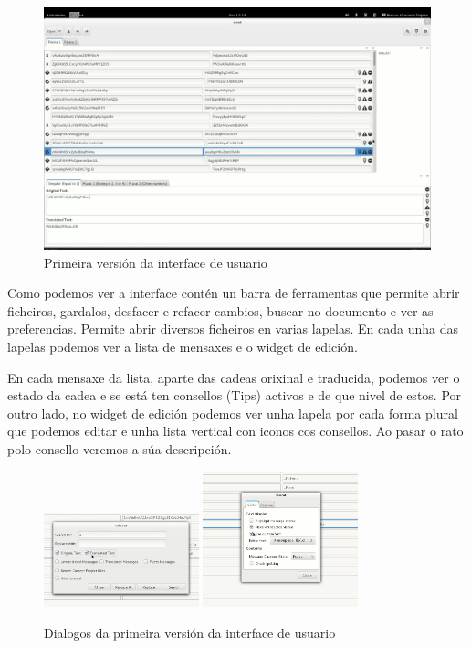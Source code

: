 \begin{figure}[h!]
  \centering
    \includegraphics[width=\textwidth]{img/gsoc1_it2_ui.png}
    \caption{Primeira versión da interface de usuario}
    \label{fig:ui:v1:general}
\end{figure}

Como podemos ver a interface contén un barra de ferramentas que permite abrir ficheiros, gardalos, desfacer e refacer cambios, buscar no documento e ver as preferencias. Permite abrir diversos ficheiros en varias lapelas. En cada unha das lapelas podemos ver a lista de mensaxes e o widget de edición.

En cada mensaxe da lista, aparte das cadeas orixinal e traducida, podemos ver o estado da cadea e se está ten consellos (Tips) activos e de que nivel de estos. Por outro lado, no widget de edición podemos ver unha lapela por cada forma plural que podemos editar e unha lista vertical con iconos cos consellos. Ao pasar o rato polo consello veremos a súa descripción.

\begin{figure}[h!]
  \centering
  \includegraphics[width=0.4\textwidth]{img/gsoc1_it3_ui.png}
  \includegraphics[width=0.4\textwidth]{img/gsoc1_it5_prefs.png}
  \caption{Dialogos da primeira versión da interface de usuario}
  \label{fig:ui:v1:dialogs}
\end{figure}

